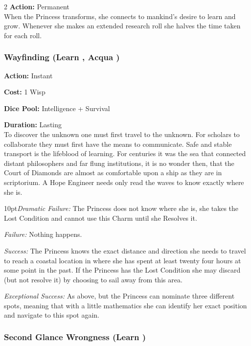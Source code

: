 \begin{multicols}{2}
\noindent \textbf{Action:} Permanent \\

\noindent When the Princess transforms, she connects to mankind's desire to learn and grow. Whenever she makes an extended research roll she halves the time taken for each roll.

\subsubsection*{Wayfinding (Learn \textbullet, Acqua \textbullet\textbullet)}

\noindent \textbf{Action:} Instant 

\noindent \textbf{Cost:} 1 Wisp

\noindent \textbf{Dice Pool:} Intelligence + Survival

\noindent \textbf{Duration:} Lasting \\

\noindent To discover the unknown one must first travel to the unknown. For scholars to collaborate they must first have the means to communicate. Safe and stable transport is the lifeblood of learning. For centuries it was the sea that connected distant philosophers and far flung institutions, it is no wonder then, that the Court of Diamonds are almost as comfortable upon a ship as they are in scriptorium. A Hope Engineer needs only read the waves to know exactly where she is. 

    \begin{myindentpar}{10pt}\emph{Dramatic Failure:} The Princess does not know where she is, she takes the Lost Condition and cannot use this Charm until she Resolves it. 

    \emph{Failure:} Nothing happens.

    \emph{Success:} The Princess knows the exact distance and direction she needs to travel to reach a coastal location in where she has spent at least twenty four hours at some point in the past. If the Princess has the Lost Condition she may discard (but not resolve it) by choosing to sail away from this area.

    \emph{Exceptional Success:}  As above, but the Princess can nominate three different spots, meaning that with a little mathematics she can identify her exact position and navigate to this spot again.\end{myindentpar}


\subsubsection*{Second Glance Wrongness (Learn \textbullet\textbullet)}


\end{multicols}
